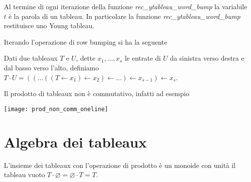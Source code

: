 \begin{oss}
Al termine di ogni iterazione della funzione
\emph{rec\_ytableau\_word\_bump} la variabile $t$ \`e la parola di un
tableau. In particolare la funzione \emph{rec\_ytableau\_word\_bump}
restituisce uno Young tableau.
\end{oss}

Iterando l'operazione di row bumping si ha la seguente

\begin{defn}
Dati due tableaux $T$ e $U$, dette $x_1,\ldots , x_s$ le entrate di
$U$ da sinistra verso destra e dal basso verso l'alto, definiamo
$T \cdot U = (( \ldots ((T \gets x_1) \gets x_2 ) \gets \ldots ) \gets x_{s-1} )
\gets x_s$.
\end{defn} 

\begin{oss}
Il prodotto di tableaux non \`e commutativo, infatti ad esempio
\begin{center}
\texttt{[image: prod\_non\_comm\_oneline]}
\end{center}
\end{oss}

\section{Algebra dei tableaux}

\begin{prop}\label{tableaux_monoid}
L'insieme dei tableaux con l'operazione di prodotto \`e un monoide con
unit\`a il tableau vuoto $T \cdot \varnothing = \varnothing \cdot T = T$.
\end{prop}

